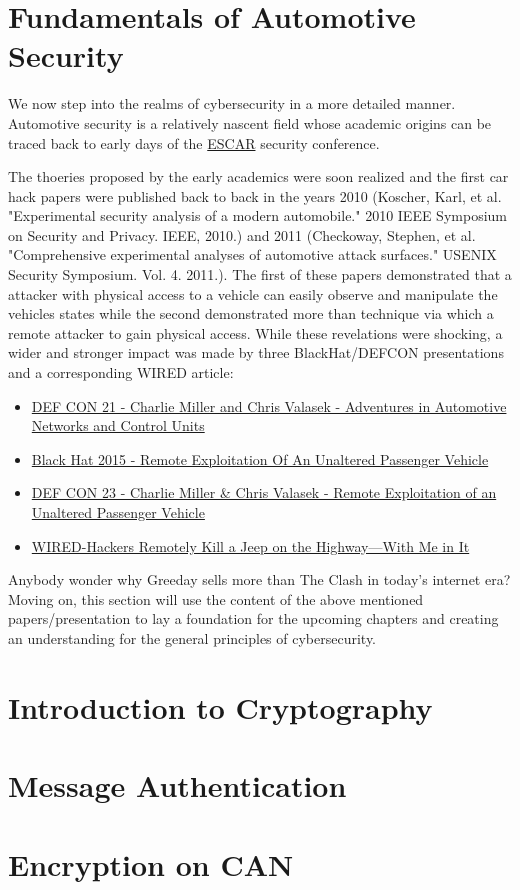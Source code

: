 \section{Fundamentals of Automotive Security}
	We now step into the realms of cybersecurity in a more detailed manner. Automotive security is a relatively nascent field whose academic origins can be traced back to early days of the \href{https://www.escar.info/history/escar-europe/escar-europe-2003-lectures-and-program-committee.html}{ESCAR} security conference.

	The thoeries proposed by the early academics were soon realized and the first car hack papers were published back to back in the years 2010 (Koscher, Karl, et al. "Experimental security analysis of a modern automobile." 2010 IEEE Symposium on Security and Privacy. IEEE, 2010.) and 2011 (Checkoway, Stephen, et al. "Comprehensive experimental analyses of automotive attack surfaces." USENIX Security Symposium. Vol. 4. 2011.). The first of these papers demonstrated that a attacker with physical access to a vehicle can easily observe and manipulate the vehicles states while the second demonstrated more than technique via which a remote attacker to gain physical access. While these revelations were shocking, a wider and stronger impact was made by three BlackHat/DEFCON presentations and a corresponding WIRED article:

	\begin{itemize}
		\item \href{https://www.youtube.com/watch?v=n70hIu9lcYo}{DEF CON 21 - Charlie Miller and Chris Valasek - Adventures in Automotive Networks and Control Units}
		\item \href{https://www.youtube.com/watch?v=MAcHkASmXEc}{Black Hat 2015 - Remote Exploitation Of An Unaltered Passenger Vehicle}
		\item \href{https://www.youtube.com/watch?v=OobLb1McxnI}{DEF CON 23 - Charlie Miller \& Chris Valasek - Remote Exploitation of an Unaltered Passenger Vehicle}
		\item \href{https://www.wired.com/2015/07/hackers-remotely-kill-jeep-highway/}{WIRED-Hackers Remotely Kill a Jeep on the Highway—With Me in It}
	\end{itemize}

	Anybody wonder why Greeday sells more than The Clash in today's internet era? Moving on, this section will use the content of the above mentioned papers/presentation to lay a foundation for the upcoming chapters and creating an understanding for the general principles of cybersecurity.

\section{Introduction to Cryptography}

\section{Message Authentication}

\section{Encryption on CAN}

